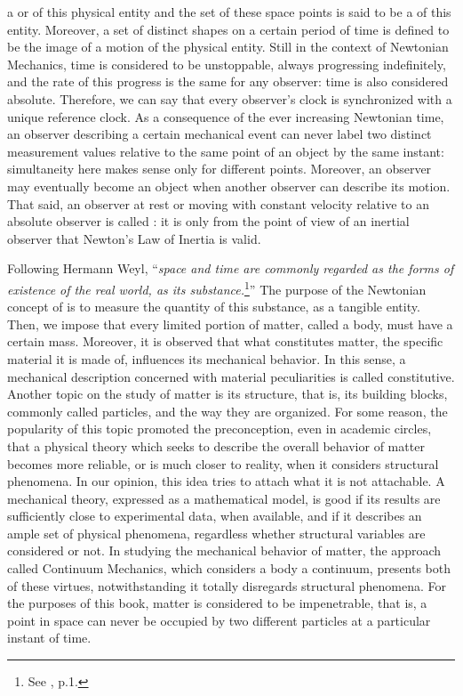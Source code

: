 a  or  of this physical entity and the set of these space points is said to be a  of this entity. Moreover, a set of distinct shapes on a certain period of time is defined to be the image of a motion of the physical entity. Still in the context of Newtonian Mechanics, time is considered to be unstoppable, always progressing indefinitely, and the rate of this progress is the same for any observer: time is also considered absolute. Therefore, we can say that every observer's clock is synchronized with a unique reference clock. As a consequence of the ever increasing Newtonian time, an observer describing a certain mechanical event can never label two distinct measurement values relative to the same point of an object by the same instant: simultaneity here makes sense only for different points. Moreover, an observer may eventually become an object when another observer can describe its motion. That said, an observer at rest or moving with constant velocity relative to an absolute observer is called : it is only from the point of view of an inertial observer that Newton's Law of Inertia is valid.   

Following Hermann Weyl, ``\emph{space and time are commonly regarded as the forms of existence of the real world,  as its substance.}\footnote{See \cite{weyl_1952_2}, p.1.}'' The purpose of the Newtonian concept of  is to measure the quantity of this substance, as a tangible entity. Then, we impose that every limited portion of matter, called a body, must have a certain mass. Moreover, it is observed that what constitutes matter, the specific material it is made of, influences its mechanical behavior. In this sense, a mechanical description concerned with material peculiarities is called constitutive. Another topic on the study of matter is its structure, that is, its building blocks, commonly called particles, and the way they are organized. For some reason, the popularity of this topic promoted the preconception, even in academic circles, that a physical theory which seeks to describe the overall behavior of matter becomes more reliable, or is much closer to reality, when it considers structural phenomena. In our opinion, this idea tries to attach what it is not attachable. A mechanical theory, expressed as a mathematical model, is good if its results are sufficiently close to experimental data, when available, and if it describes an ample set of physical phenomena, regardless whether structural variables are considered or not. In studying the mechanical behavior of matter, the approach called Continuum Mechanics, which considers a body a continuum, presents both of these virtues, notwithstanding it totally disregards structural phenomena. For the purposes of this book, matter is considered to be impenetrable, that is, a point in space can never be occupied by two different particles at a particular instant of time. 

